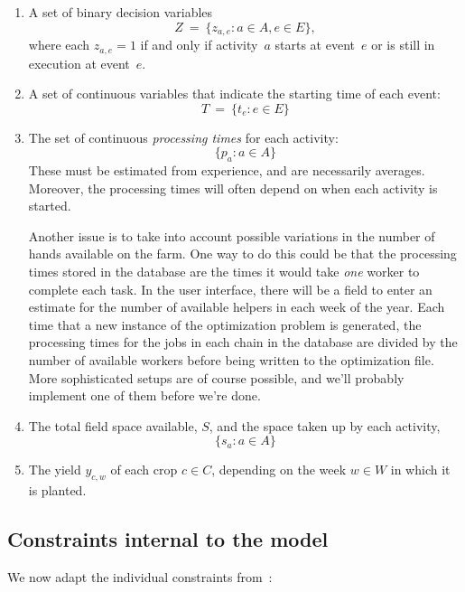 \documentclass[11pt,reqno]{amsart}
\numberwithin{equation}{section}
\begin{document}
\begin{enumerate}
\item A set of binary decision variables 
  \[
     Z
     \ = \
     \big\{z_{a,e}: a\in A, e\in E\big\},
  \]
  where each $z_{a,e}=1$ if and only if activity~$a$ starts at
  event~$e$ or is still in execution at event~$e$.

\smallskip
\item A set of continuous variables that indicate the starting time of each event:
  \[
     T
     \ = \
     \big\{t_e : e\in E\big\}
  \]

\smallskip
\item The set of continuous \emph{processing times} for each activity:
  \[
      \{p_a:a\in A\}
  \]  
  These must be estimated from experience, and are necessarily averages. Moreover, the
  processing times will often depend on when each activity is started.

  Another issue is to take into account possible variations in the number of hands
  available on the farm. One way to do this could be that the processing times stored in
  the database are the times it would take \emph{one} worker to complete each task. In the
  user interface, there will be a field to enter an estimate for the number of available
  helpers in each week of the year. Each time that a new instance of the optimization
  problem is generated, the processing times for the jobs in each chain in the database
  are divided by the number of available workers before being written to the optimization
  file. More sophisticated setups are of course possible, and we'll probably implement one
  of them before we're done.

  \smallskip
\item The total field space available, $S$, and the space taken up
  by each activity,
  \[
      \{s_a : a\in A\}
  \]

\smallskip
\item The yield $y_{c,w}$ of each crop $c\in C$, depending on the week $w\in W$ in which
  it is planted.

\end{enumerate}

\subsection{Constraints internal to the model}

We now adapt the individual constraints from~\cite{artigues-etal11}:
\end{document}
